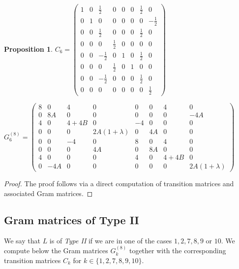 \documentclass{amsart}
\theoremstyle{plain}
\newtheorem{proposition}[theorem]{Proposition}
\theoremstyle{definition}
\theoremstyle{remark}
\numberwithin{equation}{section}
\begin{document}
\begin{proposition}
\begin{minipage}[t]{0.38\textwidth}
{    $C_6 = 
    \begin{pmatrix}
    1 & 0 & \frac{1}{2} & 0 & 0 & 0 & \frac{1}{2} & 0 \\
    0 & 1 & 0 & 0 & 0 & 0 & 0 & -\frac{1}{2} \\
    0 & 0 & \frac{1}{2} & 0 & 0 & 0 & \frac{1}{2} & 0 \\
    0 & 0 & 0 & \frac{1}{2} & 0 & 0 & 0 & 0 \\
    0 & 0 & -\frac{1}{2} & 0 & 1 & 0 & \frac{1}{2} & 0 \\
    0 & 0 & 0 & \frac{1}{2} & 0 & 1 & 0 & 0 \\
    0 & 0 & -\frac{1}{2} & 0 & 0 & 0 & \frac{1}{2} & 0 \\
    0 & 0 & 0 & 0 & 0 & 0 & 0 & \frac{1}{2} 
    \end{pmatrix}
    $
    }
\end{minipage}
\hfill
\begin{minipage}[t]{0.62\textwidth}
    \vspace{5pt}
    { %
    $G_{6}^{(8)} = 
    \begin{pmatrix}
    8 & 0 & 4 & 0 & 0 & 0 & 4 & 0 \\
    0 & 8A & 0 & 0 & 0 & 0 & 0 & -4A \\
    4 & 0 & 4+4B & 0 & -4 & 0 & 0 & 0 \\
    0 & 0 & 0 & 2A(1+\lambda) & 0 & 4A & 0 & 0 \\
    0 & 0 & -4 & 0 & 8 & 0 & 4 & 0 \\
    0 & 0 & 0 & 4A & 0 & 8A & 0 & 0 \\
    4 & 0 & 0 & 0 & 4 & 0 & 4+4B & 0 \\
    0 & -4A & 0 & 0 & 0 & 0 & 0 & 2A(1+\lambda)
    \end{pmatrix}
    $
    }
\end{minipage}
\end{proposition}

\begin{proof}
    The proof follows via a direct computation of transition matrices and associated Gram matrices.
\end{proof}
\subsection{Gram matrices of Type II}  We say that $L$ is of \emph{Type II} if we are in one of the cases $1,2,7,8,9$ or $10$.
\noindent We compute below the Gram matrices \( G_{k}^{(8)} \) together with the corresponding transition matrices \( C_{k} \) for \( k \in \{1,2,7,8,9,10\} \). 
\end{document}
